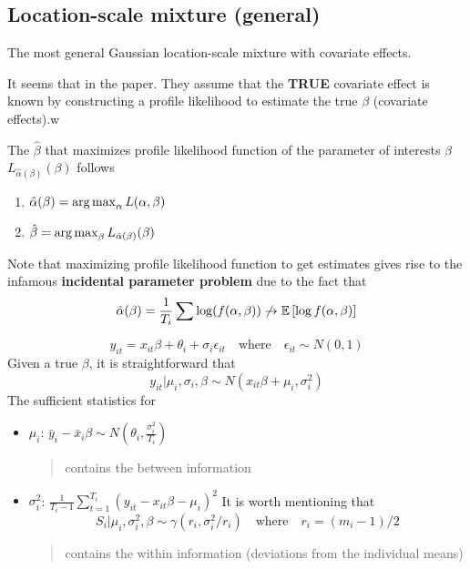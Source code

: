 \subsection{Location-scale mixture (general)}
The most general Gaussian location-scale mixture with covariate effects.
\begin{question}
    It seems that in the paper. They assume that the \textbf{TRUE} covariate effect is known by constructing a profile likelihood to estimate the true $\beta$ (covariate effects).w
\end{question}
\begin{remark}
    The $\hat{\beta}$ that maximizes profile likelihood function of the parameter of interests $\beta$ $L_{\hat{\alpha}(\beta)}(\beta)$ follows \begin{enumerate}
        \item $\hat{\alpha}(\beta)=\operatorname*{arg\,max}_{\alpha} L(\alpha,\beta)$
        \item $\hat{\beta}=\operatorname*{arg\,max}_\beta L_{\hat{\alpha}(\beta)}(\beta)$
    \end{enumerate}
    Note that maximizing profile likelihood function to get estimates gives rise to the infamous \textbf{incidental parameter problem} due to the fact that \begin{equation*}
        \hat{\alpha}(\beta)=\frac{1}{T_i}\sum \log(f(\alpha,\beta)) \not\rightarrow \mathbb{E}\left[\log f(\alpha,\beta)\right]
    \end{equation*}
\end{remark}
\begin{equation*}
    y_{it}=x_{it}\beta+\theta_i+\sigma_i\epsilon_{it} \quad \text{where} \quad \epsilon_{it}\sim N(0,1)
\end{equation*}
Given a true $\beta$, it is straightforward that \begin{equation*}
    y_{it}|\mu_i,\sigma_i,\beta \sim N(x_{it}\beta+\mu_i,\sigma_i^2)
\end{equation*}
The sufficient statistics for
\begin{itemize}
    \item $\mu_i$: $\bar{y}_i-\bar{x}_i\beta \sim N(\theta_i,\frac{\sigma_i^2}{T_i})$
          \begin{quote}
              contains the between information
          \end{quote}
    \item $\sigma_i^2$: $\frac{1}{T_i-1}\sum_{t=1}^{T_i}(y_{it}-x_{it}\beta-\mu_i)^2$
          It is worth mentioning that \begin{equation*}
              S_i|\mu_i,\sigma_i^2,\beta \sim \gamma(r_i,\sigma_i^2/r_i) \quad \text{where} \quad r_i=(m_i-1)/2
          \end{equation*}
          \begin{quote}
              contains the within information (deviations from the individual means)
          \end{quote}
\end{itemize}
